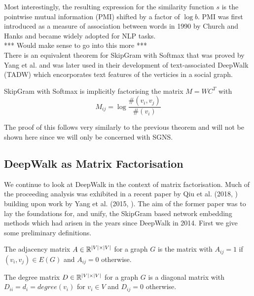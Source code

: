 \documentclass[a4paper]{article}
\begin{document}
\noindent Most interestingly, the resulting expression for the similarity function $s$ is
the pointwise mutual information (PMI) shifted by a factor of $\log b$. PMI was
first introduced as a measure of association between words in 1990 by Church and Hanks
\cite{church1990} and became widely adopted for NLP tasks.\\
*** Would make sense to go into this more ***\\
There is an equivalent theorem for SkipGram with Softmax that was proved by Yang
et al.\cite{yangalternative2015} and was later used in their development of
text-associated DeepWalk (TADW)\cite{yang2015} which encorporates text features
of the verticies in a social graph.

\begin{theorem}[Yang et al. (2015)]
  SkipGram with Softmax is implicitly factorising the matrix $M = WC^T$ with
  \[M_{ij} = \log{\frac{\#(v_i,v_j)}{\#(v_i)}}\]
\end{theorem}
The proof of this follows very similarly to the previous theorem and will not be
shown here since we will only be concerned with SGNS.

\subsection{DeepWalk as Matrix Factorisation}
We continue to look at DeepWalk in the context of matrix factorisation. Much of the proceeding analysis was exhibited in a recent paper by Qiu et
al. (2018, \cite{qiu2018}) building upon work by Yang et al. (2015, \cite{yang2015}). The aim of the former paper was to lay the foundations for, and
unify, the SkipGram based network embedding methods which had arisen in the years since DeepWalk in 2014. First we give some preliminary definitions.
\begin{definition}
  The adjacency matrix $A \in \R^{|V| \times |V|}$ for a graph $G$ is the matrix with $A_{ij} = 1$ if $(v_i, v_j) \in E(G)$ and $A_{ij} = 0$ otherwise.
\end{definition}

\begin{definition}
  The degree matrix $D \in \R^{|V| \times |V|}$ for a graph $G$ is a diagonal
  matrix with $D_{ii} = d_i = degree(v_i)$ for $v_i \in V$ and $D_{ij} = 0$ otherwise.
\end{definition}
\end{document}
